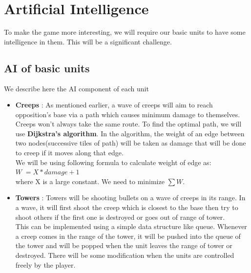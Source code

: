 \documentclass{article}
\begin{document}
\newpage
\section{Artificial Intelligence}
To make the game more interesting, we will require our basic units to have some intelligence in them. This will be a significant challenge.
\subsection{AI of basic units}
We describe here the AI component of each unit
\begin{itemize}
\item \textbf{Creeps} : As mentioned earlier, a wave of creeps will aim to reach opposition's base via a path which causes minimum damage to themselves. Creeps won’t always take the same route. To find the optimal path, we will use \textbf{Dijkstra's algorithm}. In the algorithm, the weight of an edge between two nodes(successive tiles of path) will be taken as damage that will be done to creep if it moves along that edge.\\
We will be using following formula to calculate weight of edge as:\\

$W \;= X*damage + 1 $\\
where X is a large constant. We need to minimize $\sum W $.\\

\item \textbf{Towers} : Towers will be shooting bullets on a wave of creeps in its range. In a wave, it will first shoot the creep which is closest to the base then try to shoot others if the first one is destroyed or goes out of range of tower.\\
This can be implemented using a simple data structure like queue. Whenever a creep comes in the range of the tower, it will be pushed into the queue of the tower and will be popped when the unit leaves the range of tower or destroyed. There will be some modification when the units are controlled freely by the player.
\end{itemize}
\end{document}
